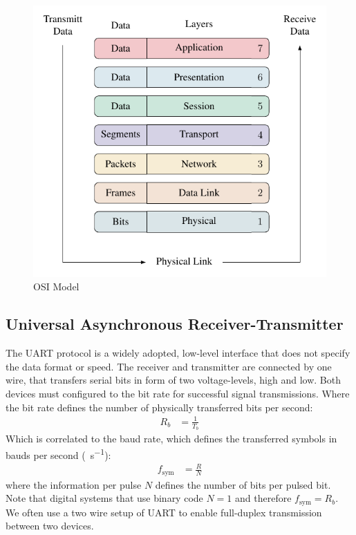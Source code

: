\begin{figure}[!htb]
  \centering
  \includegraphics[scale=1]{figures/data_transmission/osi_model/osi_model}
  \caption[OSI Model]{OSI Model%
  \label{fig:osi_model}}
\end{figure}

\subsection{Universal Asynchronous Receiver-Transmitter}
The \ac{UART} protocol is a widely adopted, low-level interface that does not specify the data format or speed. The receiver and transmitter are connected by one wire, that transfers serial bits in form of two voltage-levels, high and low. Both devices must configured to the bit rate for successful signal transmissions. Where the bit rate defines the number of physically transferred bits per second:
\begin{align}
  R_b &= \frac{1}{T_b}
\end{align}
Which is correlated to the baud rate, which defines the transferred symbols in bauds per second (\si{\baud\per\second}):
\begin{align}
  f_{\text{sym}} &= \frac{R}{N}
\end{align}
where the information per pulse $N$ defines the number of bits per pulsed bit. Note that digital systems that use binary code $N=1$ and therefore $f_{\text{sym}}=R_b$.
We often use a two wire setup of \ac{UART} to enable full-duplex transmission between two devices.

